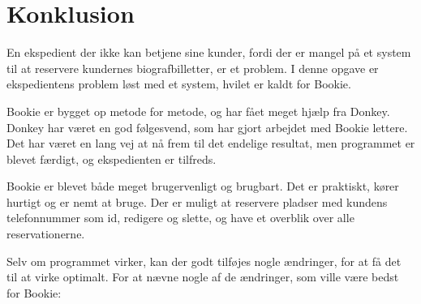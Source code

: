 \chapter{Konklusion}

En ekspedient der ikke kan betjene sine kunder, fordi der er mangel på et system til at reservere kundernes biografbilletter, er et problem. I denne opgave er ekspedientens problem løst med et system, hvilet er kaldt for Bookie.

Bookie er bygget op metode for metode, og har fået meget hjælp fra Donkey. Donkey har været en god følgesvend, som har gjort arbejdet med Bookie lettere. Det har været en lang vej at nå frem til det endelige resultat, men programmet er blevet færdigt, og ekspedienten er tilfreds.

Bookie er blevet både meget brugervenligt og brugbart. Det er praktiskt, kører hurtigt og er nemt at bruge. Der er muligt at reservere pladser med kundens telefonnummer som id, redigere og slette, og have et overblik over alle reservationerne. 

Selv om programmet virker, kan der godt tilføjes nogle ændringer, for at få det til at virke optimalt. For at nævne nogle af de ændringer, som ville være bedst for Bookie:

